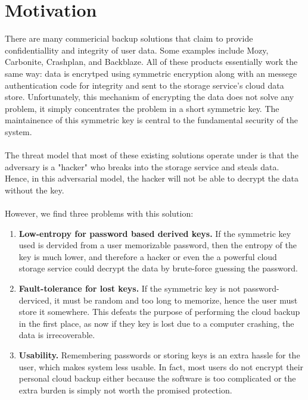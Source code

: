 \documentclass[letterpaper,twocolumn,10pt]{article}
\begin{document}
\section{Motivation}
There are many commericial backup solutions that claim to provide confidentiallity and integrity of user data. Some examples include Mozy, Carbonite, Crashplan, and Backblaze. All of these products essentially work the same way: data is encrytped using symmetric encryption along with an messege authentication code for integrity and sent to the storage service's cloud data store. Unfortunately, this mechanism of encrypting the data does not solve any problem, it simply concentrates the problem in a short symmetric key. The maintainence of this symmetric key is central to the fundamental security of the system.
\\\\
The threat model that most of these existing solutions operate under is that the adversary is a "hacker" who breaks into the storage service and steals data. Hence, in this adversarial model, the hacker will not be able to decrypt the data without the key.
\\\\
However, we find three problems with this solution:
\begin{enumerate}
	\item {\bf Low-entropy for password based derived keys.} If the symmetric key used is dervided from a user memorizable password, then the entropy of the key is much lower, and therefore a hacker or even the a powerful cloud storage service could decrypt the data by brute-force guessing the password.

	\item {\bf Fault-tolerance for lost keys.} If the symmetric key is not password-derviced, it must be random and too long to memorize, hence the user must store it somewhere. This defeats the purpose of performing the cloud backup in the first place, as now if they key is lost due to a computer crashing, the data is irrecoverable.

	\item {\bf Usability.} Remembering passwords or storing keys is an extra hassle for the user, which makes system less usable. In fact, most users do not encrypt their personal cloud backup either because the software is too complicated or the extra burden is simply not worth the promised protection.
\end{enumerate}
\end{document}

